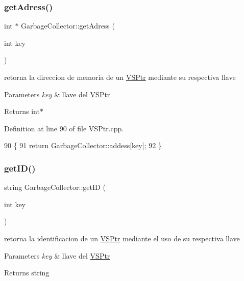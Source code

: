 \subsubsection{\texorpdfstring{get\+Adress()}{getAdress()}}
{\footnotesize\ttfamily int $\ast$ Garbage\+Collector\+::get\+Adress (\begin{DoxyParamCaption}\item[{int}]{key }\end{DoxyParamCaption})}



retorna la direccion de memoria de un \hyperlink{classVSPtr}{V\+S\+Ptr} mediante su respectiva llave 


\begin{DoxyParams}{Parameters}
{\em key} & llave del \hyperlink{classVSPtr}{V\+S\+Ptr} \\
\hline
\end{DoxyParams}
\begin{DoxyReturn}{Returns}
int$\ast$ 
\end{DoxyReturn}


Definition at line 90 of file V\+S\+Ptr.\+cpp.


\begin{DoxyCode}
90                                        \{
91     \textcolor{keywordflow}{return} GarbageCollector::addess[key];
92 \}
\end{DoxyCode}
\mbox{\label{classGarbageCollector_a6bd32127344dabc3b5af12e8ddabace5}} 
\subsubsection{\texorpdfstring{get\+I\+D()}{getID()}}
{\footnotesize\ttfamily string Garbage\+Collector\+::get\+ID (\begin{DoxyParamCaption}\item[{int}]{key }\end{DoxyParamCaption})}



retorna la identificacion de un \hyperlink{classVSPtr}{V\+S\+Ptr} mediante el uso de su respectiva llave 


\begin{DoxyParams}{Parameters}
{\em key} & llave del \hyperlink{classVSPtr}{V\+S\+Ptr} \\
\hline
\end{DoxyParams}
\begin{DoxyReturn}{Returns}
string 
\end{DoxyReturn}


